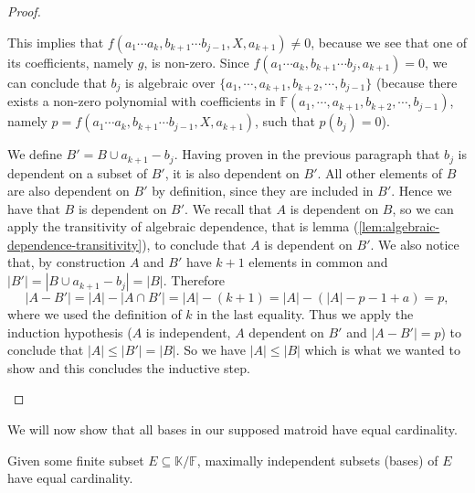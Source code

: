 \begin{proof}
\begin{enumerate}
		      This implies that $f(a _1 \cdots a _k, b _{k + 1} \cdots b _{j - 1}, X, a _{k + 1}) \neq 0$, because we see that one of its coefficients, namely $g$, is non-zero. Since $ f(a _1 \cdots a _{k}, b _{k + 1} \cdots b _{j}, a _{k + 1})  = 0$, we can conclude that $b_j$ is algebraic over $\{a _1, \cdots, a _{k + 1}, b _{k + 2} ,\cdots,b_{j-1}\}$ (because there exists a non-zero polynomial with coefficients in $\mathbb{F}(a _1, \cdots, a _{k + 1}, b _{k + 2} ,\cdots,b_{j-1})$, namely $p = f(a _1 \cdots a _k, b _{k + 1} \cdots b _{j - 1}, X, a _{k + 1})$, such that $p(b_j) = 0$).

		We define $B' = B \cup a _{k + 1} - b_j$. Having proven in the previous paragraph that $b_j$ is dependent on a subset of $B'$, it is also dependent on $B'$. All other elements of $B$ are also dependent on $B'$ by definition, since they are included in $B'$. Hence we have that $B$ is dependent on $B'$. We recall that $A$ is dependent on $B$, so we can apply the transitivity of algebraic dependence, that is lemma (\ref{lem:algebraic-dependence-transitivity}), to conclude that $A$ is dependent on $B'$. We also notice that, by construction $A$ and $B'$ have $k + 1$ elements in common and $|B'| = |B \cup a_{k+1} - b_j| = |B|$. Therefore $$|A - B'| = |A| - |A\cap B'| = |A| - (k+1) = |A| - (|A| - p - 1 + a) = p, $$ where we used the definition of $k$ in the last equality. Thus we apply the induction hypothesis ($A$ is independent, $A$ dependent on $B'$ and $|A-B'| = p$) to conclude that $|A|\leq |B'| = |B|$. So we have $|A|\leq |B|$ which is what we wanted to show and this concludes the inductive step.
	\end{enumerate}
\end{proof}

We will now show that all bases in our supposed matroid have equal cardinality.

\begin{lemma}\label{lem:algebraic-matroid-equal-size-bases}
	Given some finite subset $E \subseteq \mathbb K / \mathbb F$, maximally independent subsets (bases) of $E$ have equal cardinality.
\end{lemma}

